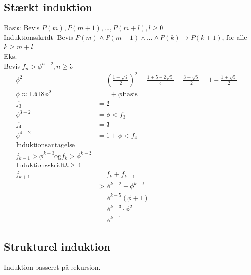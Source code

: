 \documentclass[12pt, a4paper]{article}
\begin{document}
			\subsection{Stærkt induktion}
				Basis: Bevis $P(m), P(m+1),...,P(m+l), l\geq 0$\\
				Induktionsskridt: Bevis $P(m)\land P(m+1)\land ... \land P(k)\rightarrow P(k+1)$, for alle $k\geq m+l$\\
				Eks. \\
				Bevis $f_n>\phi^{n-2},n\geq 3$\\
				\begin{align*}
					\phi^2&=(\frac{1+\sqrt{5}}{2})^2=\frac{1+5+2\sqrt{5}}{4}=\frac{3+\sqrt{5}}{2}=1+\frac{1+\sqrt{5}}{2}\\
					\phi\approx 1.618
					\phi^2&=1+\phi
					\text{Basis}\\
					f_3&=2\\
					\phi^{3-2}&=\phi<f_3\\
					f_4&=3\\
					\phi^{4-2}&=1+\phi<f_4\\[4mm]
					\text{Induktionsantagelse}\\
					f_{k-1}>\phi^{k-3}\text{og} f_k>\phi^{k-2}\\[4mm]
					\text{Induktionsskridt} k\geq 4\\
					f_{k+1}&=f_k+f_{k-1}\\
					&>\phi^{k-2}+\phi^{k-3}\\
					&=\phi^{k-5}(\phi+1)\\
					&=\phi^{k-3}\cdot \phi^2\\
					&=\phi^{k-1}
				\end{align*}
			\subsection{Strukturel induktion}
				Induktion basseret på rekursion.
\end{document}

